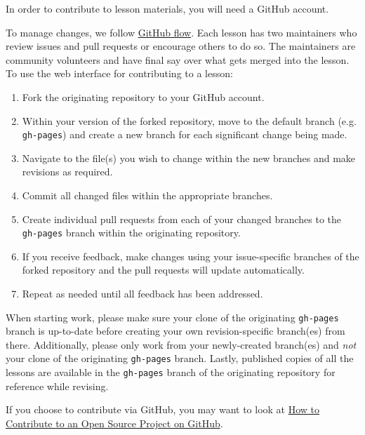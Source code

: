 \documentclass[]{book}
\providecommand{\tightlist}{%
  \setlength{\itemsep}{0pt}\setlength{\parskip}{0pt}}
\begin{document}
In order to contribute to lesson materials, you will need a GitHub account.

To manage changes, we follow \href{https://guides.github.com/introduction/flow/}{GitHub flow}.
Each lesson has two maintainers who review issues and pull requests or encourage others to do so.
The maintainers are community volunteers and have final say over what gets merged into the lesson.
To use the web interface for contributing to a lesson:

\begin{enumerate}
\def\labelenumi{\arabic{enumi}.}
\tightlist
\item
  Fork the originating repository to your GitHub account.
\item
  Within your version of the forked repository, move to the
  default branch (e.g. \texttt{gh-pages}) and
  create a new branch for each significant change being made.
\item
  Navigate to the file(s) you wish to change within the new branches and make revisions as required.
\item
  Commit all changed files within the appropriate branches.
\item
  Create individual pull requests from each of your changed branches
  to the \texttt{gh-pages} branch within the originating repository.
\item
  If you receive feedback, make changes using your issue-specific branches of the forked
  repository and the pull requests will update automatically.
\item
  Repeat as needed until all feedback has been addressed.
\end{enumerate}

When starting work, please make sure your clone of the originating \texttt{gh-pages} branch is up-to-date
before creating your own revision-specific branch(es) from there.
Additionally, please only work from your newly-created branch(es) and \emph{not}
your clone of the originating \texttt{gh-pages} branch.
Lastly, published copies of all the lessons are available in the \texttt{gh-pages} branch of the originating
repository for reference while revising.

If you choose to contribute via GitHub, you may want to look at
\href{https://egghead.io/series/how-to-contribute-to-an-open-source-project-on-github}{How to Contribute to an Open Source Project on GitHub}.


\end{document}
